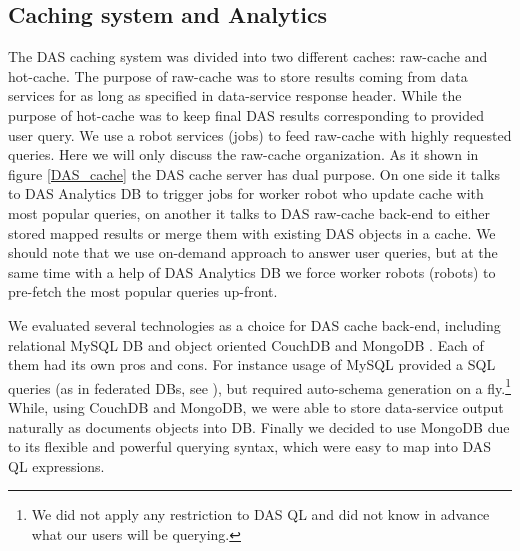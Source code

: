 \documentclass[a4paper]{jpconf}
\begin{document}
\subsection{Caching system and Analytics}
The DAS caching system was divided into two different caches: raw-cache and hot-cache.
The purpose of raw-cache was to store results coming from data services for
as long as specified in data-service response header. While the purpose of hot-cache
was to keep final DAS results corresponding to provided user query. We use a robot
services (jobs) to feed raw-cache with highly requested queries. Here we will only
discuss the raw-cache organization. 
As it shown in figure \ref{DAS_cache} the DAS cache server has dual purpose.
On one side it talks to DAS Analytics DB to trigger jobs for worker robot
who update cache with most popular queries, on another it talks to DAS
raw-cache back-end to either stored mapped results or merge them with 
existing DAS objects in a cache. We should note that we use on-demand
approach to answer user queries, but at the same time with a help of
DAS Analytics DB we force worker robots (robots) to pre-fetch
the most popular queries up-front.

We evaluated several technologies
as a choice for DAS cache back-end, including relational MySQL DB \cite{MySQL} 
and object oriented CouchDB \cite{CouchDB} and MongoDB \cite{MongoDB}.
Each of them had its own pros and cons. For instance usage
of MySQL provided a SQL queries (as in federated DBs, see \cite{FedDB}), but
required auto-schema generation on a fly.\footnote{We did not apply any
restriction to DAS QL and did not know in advance what our users will be
querying.} While, using CouchDB and MongoDB, we were able to store
data-service output naturally as documents objects into DB. Finally we decided
to use MongoDB due to its flexible and
powerful querying syntax, which were easy to map into DAS QL expressions. 
\end{document}
